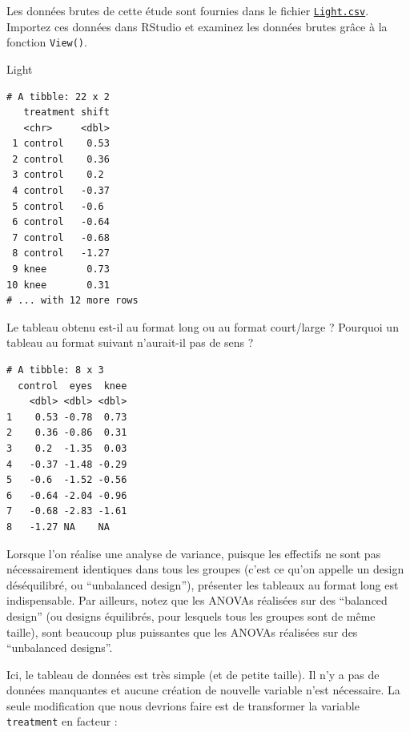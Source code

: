 \documentclass[
  a4paper,
]{article}
\newenvironment{Shaded}{\begin{snugshade}}{\end{snugshade}}
\newcommand{\DataTypeTok}[1]{\textcolor[rgb]{0.00,0.34,0.68}{#1}}
\newcommand{\KeywordTok}[1]{\textcolor[rgb]{0.12,0.11,0.11}{\textbf{#1}}}
\newcommand{\NormalTok}[1]{\textcolor[rgb]{0.12,0.11,0.11}{#1}}
\newcommand{\OperatorTok}[1]{\textcolor[rgb]{0.12,0.11,0.11}{#1}}
\newcommand{\StringTok}[1]{\textcolor[rgb]{0.75,0.01,0.01}{#1}}
\begin{document}
Les données brutes de cette étude sont fournies dans le fichier \href{https://besibo.github.io/Biometrie3/data/Light.csv}{\texttt{Light.csv}}. Importez ces données dans RStudio et examinez les données brutes grâce à la fonction \texttt{View()}.

\begin{Shaded}
\begin{Highlighting}[]
\NormalTok{Light}
\end{Highlighting}
\end{Shaded}

\begin{verbatim}
# A tibble: 22 x 2
   treatment shift
   <chr>     <dbl>
 1 control    0.53
 2 control    0.36
 3 control    0.2 
 4 control   -0.37
 5 control   -0.6 
 6 control   -0.64
 7 control   -0.68
 8 control   -1.27
 9 knee       0.73
10 knee       0.31
# ... with 12 more rows
\end{verbatim}

Le tableau obtenu est-il au format long ou au format court/large ? Pourquoi un tableau au format suivant n'aurait-il pas de sens ?

\begin{verbatim}
# A tibble: 8 x 3
  control  eyes  knee
    <dbl> <dbl> <dbl>
1    0.53 -0.78  0.73
2    0.36 -0.86  0.31
3    0.2  -1.35  0.03
4   -0.37 -1.48 -0.29
5   -0.6  -1.52 -0.56
6   -0.64 -2.04 -0.96
7   -0.68 -2.83 -1.61
8   -1.27 NA    NA   
\end{verbatim}

Lorsque l'on réalise une analyse de variance, puisque les effectifs ne sont pas nécessairement identiques dans tous les groupes (c'est ce qu'on appelle un design déséquilibré, ou ``unbalanced design''), présenter les tableaux au format long est indispensable. Par ailleurs, notez que les ANOVAs réalisées sur des ``balanced design'' (ou designs équilibrés, pour lesquels tous les groupes sont de même taille), sont beaucoup plus puissantes que les ANOVAs réalisées sur des ``unbalanced designs''.

Ici, le tableau de données est très simple (et de petite taille). Il n'y a pas de données manquantes et aucune création de nouvelle variable n'est nécessaire. La seule modification que nous devrions faire est de transformer la variable \texttt{treatment} en facteur :

\begin{Shaded}
\end{Shaded}
\end{document}
